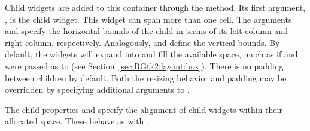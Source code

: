 Child widgets are added to this container through the
 method. Its first argument,
, is the child widget. This widget can
span more than one cell. The arguments
 and
 specify the horizontal bounds
of the child in terms of its left column and right column,
respectively. Analogously,  and
 define the vertical bounds.
By default, the widgets will expand into and fill the available space,
much as if  and
 were passed as  to
 (see
Section~\ref{sec:RGtk2:layout:box}). There is no padding between
children by default. Both the resizing behavior and padding may be
overridden by specifying additional arguments to
.

The child properties  and  specify the
alignment of child widgets within their allocated space. These behave
as with .


